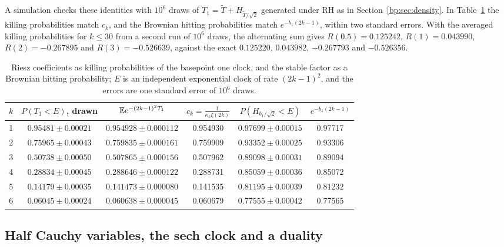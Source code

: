 A simulation checks these identities with $10^6$ draws of $T_1=\widetilde T+H_{\widetilde T/\sqrt2}$ generated under RH as in Section~\ref{bp:sec:density}. In Table~\ref{ri:tab:kill} the killing probabilities match $c_k$, and the Brownian hitting probabilities match $e^{-b_1(2k-1)}$, within two standard errors. With the averaged killing probabilities for $k\le30$ from a second run of $10^6$ draws, the alternating sum gives $R(0.5)=0.125242$, $R(1)=0.043990$, $R(2)=-0.267895$ and $R(3)=-0.526639$, against the exact $0.125220$, $0.043982$, $-0.267793$ and $-0.526356$.

\begin{table}[htbp]
\centering\footnotesize
\begin{tabular}{@{}cccccc@{}}
\toprule
$k$ & $P(T_1<E)$, drawn & $\mathbb{E} e^{-(2k-1)^2T_1}$ & $c_k=\frac1{\kappa_k\zeta(2k)}$ & $P(H_{b_1/\sqrt2}<E)$ & $e^{-b_1(2k-1)}$\\
\midrule
1 & $0.95481\pm0.00021$ & $0.954928\pm0.000112$ & 0.954930 & $0.97699\pm0.00015$ & 0.97717\\
2 & $0.75965\pm0.00043$ & $0.759835\pm0.000161$ & 0.759909 & $0.93352\pm0.00025$ & 0.93306\\
3 & $0.50738\pm0.00050$ & $0.507865\pm0.000156$ & 0.507962 & $0.89098\pm0.00031$ & 0.89094\\
4 & $0.28834\pm0.00045$ & $0.288646\pm0.000122$ & 0.288731 & $0.85059\pm0.00036$ & 0.85072\\
5 & $0.14179\pm0.00035$ & $0.141473\pm0.000080$ & 0.141535 & $0.81195\pm0.00039$ & 0.81232\\
6 & $0.06045\pm0.00024$ & $0.060638\pm0.000045$ & 0.060679 & $0.77555\pm0.00042$ & 0.77565\\
\bottomrule
\end{tabular}
\caption{Riesz coefficients as killing probabilities of the basepoint one clock, and the stable factor as a Brownian hitting probability; $E$ is an independent exponential clock of rate $(2k-1)^2$, and the errors are one standard error of $10^6$ draws.}
\label{ri:tab:kill}
\end{table}

\subsection{Half Cauchy variables, the sech clock and a duality}\label{ri:sec:cauchy}

